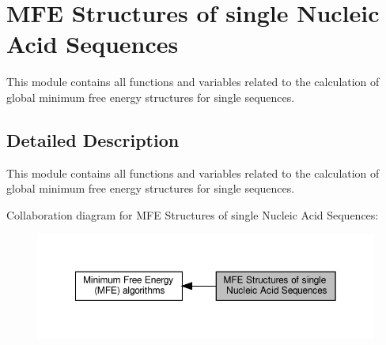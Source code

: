 \hypertarget{group__mfe__fold__single}{}\section{M\+FE Structures of single Nucleic Acid Sequences}
\label{group__mfe__fold__single}


This module contains all functions and variables related to the calculation of global minimum free energy structures for single sequences.  




\subsection{Detailed Description}
This module contains all functions and variables related to the calculation of global minimum free energy structures for single sequences. 

Collaboration diagram for M\+FE Structures of single Nucleic Acid Sequences\+:
\nopagebreak
\begin{figure}[H]
\begin{center}
\leavevmode
\includegraphics[width=350pt]{group__mfe__fold__single}
\end{center}
\end{figure}
